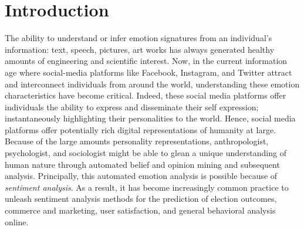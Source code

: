 \section{Introduction}
\frenchspacing
The ability to understand or infer emotion signatures from an individual's information: text, speech, pictures, art works has always generated healthy amounts of engineering and scientific interest. Now, in the current information age where social-media platforms like Facebook, Instagram, and Twitter attract and interconnect individuals from around the world, understanding these emotion characteristics have become critical. Indeed, these social media platforms offer individuals the ability to express and disseminate their self expression; instantaneously highlighting their personalities to the world. Hence, social media platforms offer potentially rich digital representations of humanity at large. Because of the large amounts personality representations, anthropologist, psychologist, and sociologist might be able to glean a unique understanding of human nature through automated belief and opinion mining and subsequent analysis. Principally, this automated emotion analysis is possible because of \textit{sentiment analysis}. As a result, it has become increasingly common practice to unleash sentiment analysis methods for the prediction of election outcomes, commerce and marketing, user satisfaction, and general behavioral analysis online.
